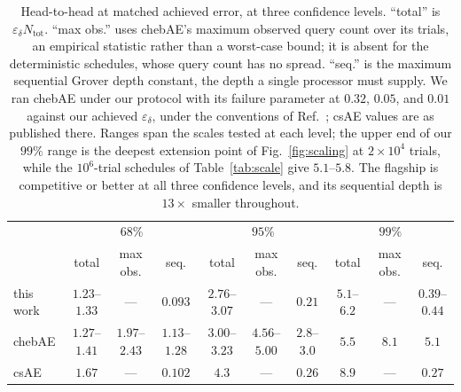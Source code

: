 \documentclass[%
 twocolumn,
 amsmath,amssymb,
prx,
longbibliography
]{revtex4-2}
\newcommand{\Ntot}{N_{\mathrm{tot}}}
\begin{document}
\begin{table}[t]
\caption{\label{tab:h2h}Head-to-head at matched achieved error, at three confidence levels. ``total'' is $\varepsilon_\delta \Ntot$. ``max obs.'' uses chebAE's maximum observed query count over its trials, an empirical statistic rather than a worst-case bound; it is absent for the deterministic schedules, whose query count has no spread. ``seq.'' is the maximum sequential Grover depth constant, the depth a single processor must supply. We ran chebAE under our protocol with its failure parameter at $0.32$, $0.05$, and $0.01$ against our achieved $\varepsilon_\delta$, under the conventions of Ref.~\cite{labib2024csae}; csAE values are as published there. Ranges span the scales tested at each level; the upper end of our $99\%$ range is the deepest extension point of Fig.~\ref{fig:scaling} at $2\times 10^4$ trials, while the $10^6$-trial schedules of Table~\ref{tab:scale} give $5.1$--$5.8$. The flagship is competitive or better at all three confidence levels, and its sequential depth is $13\times$ smaller throughout.}
\begin{ruledtabular}
\begin{tabular}{lccccccccc}
 & \multicolumn{3}{c}{$68\%$} & \multicolumn{3}{c}{$95\%$} & \multicolumn{3}{c}{$99\%$} \\
 & total & max obs. & seq. & total & max obs. & seq. & total & max obs. & seq. \\
\hline
this work & $1.23$--$1.33$ & --- & $0.093$ & $2.76$--$3.07$ & --- & $0.21$ & $5.1$--$6.2$ & --- & $0.39$--$0.44$ \\
chebAE \cite{Rall2023amplitudeestimation} & $1.27$--$1.41$ & $1.97$--$2.43$ & $1.13$--$1.28$ & $3.00$--$3.23$ & $4.56$--$5.00$ & $2.8$--$3.0$ & $5.5$ & $8.1$ & $5.1$ \\
csAE \cite{labib2024csae} & $1.67$ & --- & $0.102$ & $4.3$ & --- & $0.26$ & $8.9$ & --- & $0.27$ \\
\end{tabular}
\end{ruledtabular}
\end{table}
\end{document}
